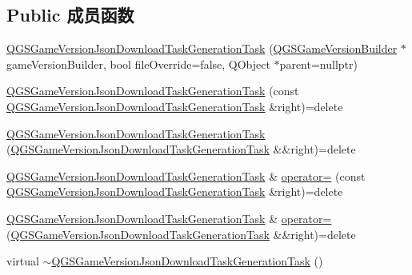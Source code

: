 \subsection*{Public 成员函数}
\begin{DoxyCompactItemize}
\item 
\mbox{\hyperlink{class_q_g_s_game_version_json_download_task_generation_task_a18ed71519edec443345992eca9d35255}{Q\+G\+S\+Game\+Version\+Json\+Download\+Task\+Generation\+Task}} (\mbox{\hyperlink{class_q_g_s_game_version_builder}{Q\+G\+S\+Game\+Version\+Builder}} $\ast$game\+Version\+Builder, bool file\+Override=false, Q\+Object $\ast$parent=nullptr)
\item 
\mbox{\hyperlink{class_q_g_s_game_version_json_download_task_generation_task_af4be0335e2400e4faabf0999daf9da72}{Q\+G\+S\+Game\+Version\+Json\+Download\+Task\+Generation\+Task}} (const \mbox{\hyperlink{class_q_g_s_game_version_json_download_task_generation_task}{Q\+G\+S\+Game\+Version\+Json\+Download\+Task\+Generation\+Task}} \&right)=delete
\item 
\mbox{\hyperlink{class_q_g_s_game_version_json_download_task_generation_task_a1e7e99ff32ebd187177120a2e843e2d8}{Q\+G\+S\+Game\+Version\+Json\+Download\+Task\+Generation\+Task}} (\mbox{\hyperlink{class_q_g_s_game_version_json_download_task_generation_task}{Q\+G\+S\+Game\+Version\+Json\+Download\+Task\+Generation\+Task}} \&\&right)=delete
\item 
\mbox{\hyperlink{class_q_g_s_game_version_json_download_task_generation_task}{Q\+G\+S\+Game\+Version\+Json\+Download\+Task\+Generation\+Task}} \& \mbox{\hyperlink{class_q_g_s_game_version_json_download_task_generation_task_a85cde79cf22a0745e31d472b08ba6b98}{operator=}} (const \mbox{\hyperlink{class_q_g_s_game_version_json_download_task_generation_task}{Q\+G\+S\+Game\+Version\+Json\+Download\+Task\+Generation\+Task}} \&right)=delete
\item 
\mbox{\hyperlink{class_q_g_s_game_version_json_download_task_generation_task}{Q\+G\+S\+Game\+Version\+Json\+Download\+Task\+Generation\+Task}} \& \mbox{\hyperlink{class_q_g_s_game_version_json_download_task_generation_task_af5cd4eaffd657cbe7520082beffebaac}{operator=}} (\mbox{\hyperlink{class_q_g_s_game_version_json_download_task_generation_task}{Q\+G\+S\+Game\+Version\+Json\+Download\+Task\+Generation\+Task}} \&\&right)=delete
\item 
virtual \mbox{\hyperlink{class_q_g_s_game_version_json_download_task_generation_task_a3fd00e2adb3434de3e6c0fa6ba4cafec}{$\sim$\+Q\+G\+S\+Game\+Version\+Json\+Download\+Task\+Generation\+Task}} ()
\end{DoxyCompactItemize}
